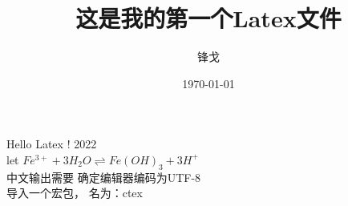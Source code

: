 \documentclass{article} %
\title{这是我的第一个Latex文件}
\author{锋戈}
\date{\today}
\begin{document}
	\maketitle 
	
	Hello Latex ! 2022 \\
	let $ Fe^{3+}+3H_2O \rightleftharpoons  Fe(OH)_3 + 3H^{+}$ \\
	中文输出需要 确定编辑器编码为UTF-8 \\
	导入一个宏包， 名为：ctex
	
	
\end{document}
